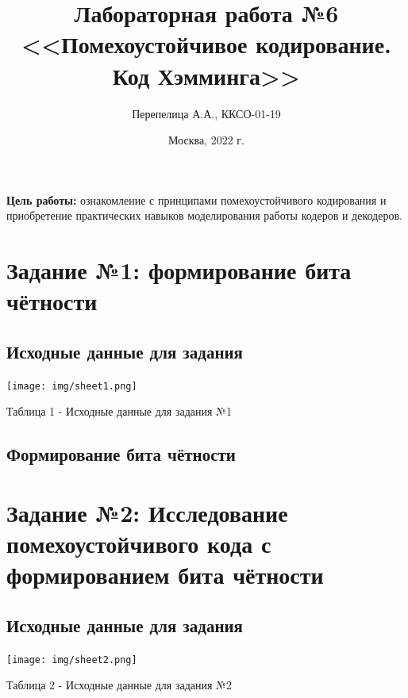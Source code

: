 \documentclass[11pt]{article}
\title{\textbf{Лабораторная работа №6\\<<Помехоустойчивое кодирование. Код Хэмминга>>}}
\author{Перепелица А.А., ККСО-01-19}
\date{Москва, 2022 г.}
\begin{document}
\maketitle
\thispagestyle{empty}
\textbf{Цель работы:}  ознакомление с принципами помехоустойчивого кодирования и приобретение практических навыков моделирования работы кодеров и декодеров. 

\section{Задание №1: формирование бита чётности}
\subsection{Исходные данные для задания}
\texttt{[image: img/sheet1.png]}
\begin{center}
    Таблица 1 - Исходные данные для задания №1
\end{center}
\subsection{Формирование бита чётности}


\newpage
\section{Задание №2: Исследование помехоустойчивого кода с формированием бита чётности}
\subsection{Исходные данные для задания}
\texttt{[image: img/sheet2.png]}
\begin{center}
    Таблица 2 - Исходные данные для задания №2
\end{center}
\end{document}
